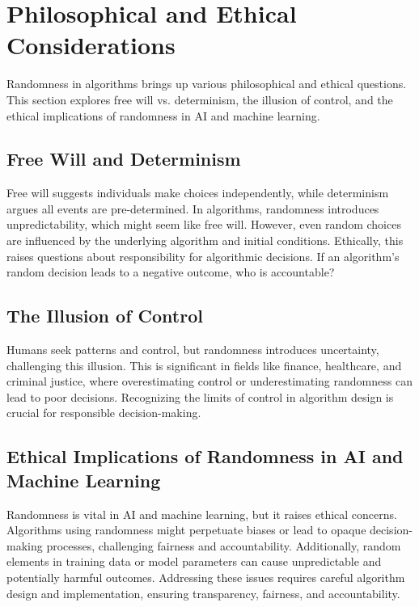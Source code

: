 \documentclass[12pt]{book} %
\begin{document}
\section{Philosophical and Ethical Considerations}

Randomness in algorithms brings up various philosophical and ethical questions. This section explores free will vs. determinism, the illusion of control, and the ethical implications of randomness in AI and machine learning.

\subsection{Free Will and Determinism}

Free will suggests individuals make choices independently, while determinism argues all events are pre-determined. In algorithms, randomness introduces unpredictability, which might seem like free will. However, even random choices are influenced by the underlying algorithm and initial conditions. Ethically, this raises questions about responsibility for algorithmic decisions. If an algorithm's random decision leads to a negative outcome, who is accountable?

\subsection{The Illusion of Control}

Humans seek patterns and control, but randomness introduces uncertainty, challenging this illusion. This is significant in fields like finance, healthcare, and criminal justice, where overestimating control or underestimating randomness can lead to poor decisions. Recognizing the limits of control in algorithm design is crucial for responsible decision-making.

\subsection{Ethical Implications of Randomness in AI and Machine Learning}

Randomness is vital in AI and machine learning, but it raises ethical concerns. Algorithms using randomness might perpetuate biases or lead to opaque decision-making processes, challenging fairness and accountability. Additionally, random elements in training data or model parameters can cause unpredictable and potentially harmful outcomes. Addressing these issues requires careful algorithm design and implementation, ensuring transparency, fairness, and accountability.
\end{document}

